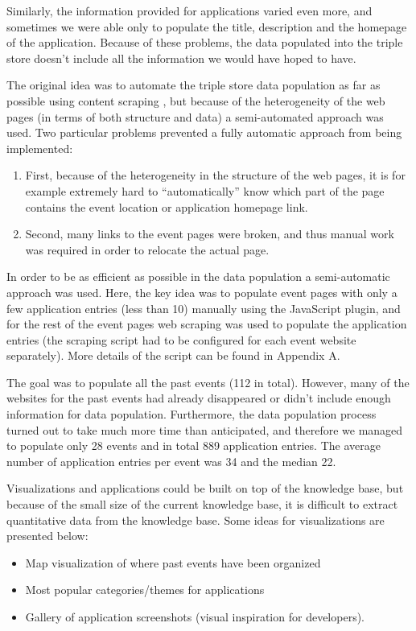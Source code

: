 Similarly, the information provided for applications varied even more, and sometimes we were able only to populate the title, description and the homepage of the application. Because of these problems, the data populated into the triple store doesn't include all the information we would have hoped to have.

The original idea was to automate the triple store data population as far as possible using content scraping , but because of the heterogeneity of the web pages (in terms of both structure and data)  a semi-automated approach was used. Two particular problems prevented a fully automatic approach from being implemented:

\begin{enumerate}
\item First, because of the heterogeneity in the structure of the web pages, it is for example extremely hard to ``automatically'' know which part of the page contains the event location or application homepage link.
\item Second, many links to the event pages were broken, and thus manual work was required in order to relocate the actual page.
\end{enumerate}


In order to be as efficient as possible in the data population a semi-automatic approach was used. Here, the key idea was to populate event pages with only a few application entries (less than 10) manually using the JavaScript plugin, and for the rest of the event pages web scraping was used to populate the application entries (the scraping script had to be configured for each event website separately). More details of the script can be found in Appendix A.

The goal was to populate all the past events (112 in total). However, many of the websites for the past events had already disappeared or didn't include enough information for data population. Furthermore, the data population process turned out to take much more time than anticipated, and therefore we managed to populate only 28 events and in total 889 application entries. The average number of application entries per event was 34 and the median 22.

Visualizations and applications could be built on top of the knowledge base, but because of the small size of the current knowledge base, it is difficult to extract quantitative data from the knowledge base. Some ideas for visualizations are presented below:
\begin{itemize}
\item Map visualization of where past events have been organized
\item Most popular categories/themes for applications
\item Gallery of application screenshots (visual inspiration for developers).
\end{itemize}


